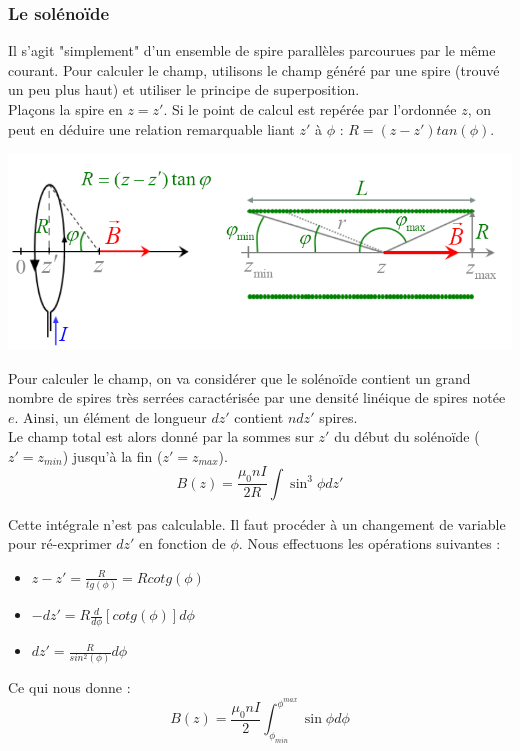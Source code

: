 \documentclass	[11pt, a4paper, openany]{book}
\begin{document}
\subsubsection{Le solénoïde}
Il s'agit "simplement" d'un ensemble de spire parallèles parcourues par le même courant. Pour calculer le champ, utilisons le champ généré par une spire (trouvé un peu plus haut) et utiliser le principe de superposition.\\

Plaçons la spire en $z = z'$. Si le point de calcul est repérée par l'ordonnée $z$, on peut en déduire une relation remarquable liant $z'$ à $\phi$ : $R = (z - z')tan(\phi)$.

\begin{center}
\includegraphics[scale=0.70]{magneto/image11.png}
\end{center}

Pour calculer le champ, on va considérer que le solénoïde contient un grand nombre de spires très serrées caractérisée par une densité linéique de spires notée $e$. Ainsi, un élément de longueur $dz'$ contient $ndz'$ spires.\\

Le champ total est alors donné par la sommes sur $z'$ du début du solénoïde ($z' = z_{min}$) jusqu'à la fin ($z' = z_{max}$).
\begin{equation}
B(z) = \frac{\mu_0 nI}{2R}\int \sin^3\phi dz'
\end{equation}

Cette intégrale n'est pas calculable. Il faut procéder à un changement de variable pour ré-exprimer $dz'$ en fonction de $\phi$. Nous effectuons les opérations suivantes :
\begin{itemize}
\item $z - z' = \frac{R}{tg(\phi)} = Rcotg(\phi)$
\item $-dz' = R\frac{d}{d\phi}[cotg(\phi)]d\phi$
\item $dz' = \frac{R}{sin^2(\phi)}d\phi$
\end{itemize}
Ce qui nous donne :
\begin{equation}
B(z) = \frac{\mu_0 nI}{2}\int_{\phi_{min}}^{\phi^{max}} \sin\phi d\phi
\end{equation}
\end{document}
